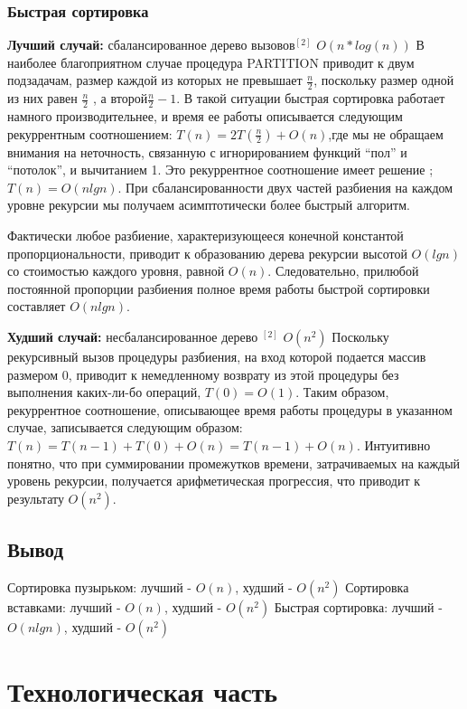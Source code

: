 \documentclass[12pt]{report}
\begin{document}
\subsection{Быстрая сортировка}
\hspace*{5mm}
\textbf{Лучший случай:} сбалансированное дерево вызовов$^{[2]}$ \(O(n*log(n))\)  
В наиболее благоприятном случае процедура PARTITION приводит к двум подзадачам, размер каждой из которых не превышает $\frac{n}{2}$, поскольку размер одной из них равен $\frac{n}{2}$ , а второй$\frac{n}{2} - 1$. В такой ситуации быстрая сортировка работает намного производительнее, и время ее работы описывается следующим рекуррентным соотношением: $T(n) = 2T(\frac{n}{2}) + O(n)$,где мы не обращаем внимания на неточность, связанную с игнорированием функций “пол” и “потолок”, и вычитанием 1. Это рекуррентное соотношение имеет решение ; $T(n) =O(nlgn)$. При сбалансированности двух частей разбиения на каждом уровне рекурсии мы получаем асимптотически более быстрый алгоритм.

Фактически любое разбиение, характеризующееся конечной константой пропорциональности, приводит к образованию дерева рекурсии высотой $O(lgn)$ со стоимостью каждого уровня, равной $O(n)$. Следовательно, прилюбой постоянной пропорции разбиения полное время работы быстрой сортировки составляет $O(nlgn)$.

\textbf{Худший случай:} несбалансированное дерево $^{[2]}$ $O(n^2)$
Поскольку рекурсивный вызов процедуры разбиения, на вход которой подается массив размером 0, приводит к немедленному возврату из этой процедуры без выполнения каких-ли-бо операций, $T(0) = O(1)$. Таким образом, рекуррентное соотношение, описывающее время работы процедуры в указанном случае, записывается следующим образом: 
$T(n) =T(n-1) +T(0) + O(n) =T(n-1) + O(n)$. Интуитивно понятно, что при суммировании промежутков времени, затрачиваемых на каждый уровень рекурсии, получается арифметическая прогрессия, что приводит к результату $O(n^2)$.

\section{Вывод}
Сортировка пузырьком: лучший - $O(n)$, худший - $O(n^2)$ \newline
Сортировка вставками: лучший - $O(n)$, худший - $O(n^2)$ \newline
Быстрая сортировка: лучший - $O(nlgn)$, худший - $O(n^2)$ \newline

\chapter{Технологическая часть}
\end{document}
